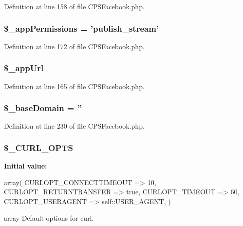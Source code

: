 Definition at line 158 of file CPSFacebook.php.

\hypertarget{classCPSFacebook_a6adcddc9592544d2e65aed888e2bfdfa}{
\subsubsection[{\$\_\-appPermissions}]{\setlength{\rightskip}{0pt plus 5cm}\$\_\-appPermissions = 'publish\_\-stream'}}
\label{classCPSFacebook_a6adcddc9592544d2e65aed888e2bfdfa}


Definition at line 172 of file CPSFacebook.php.

\hypertarget{classCPSFacebook_a4416500680a7b92e95184727c36eec91}{
\subsubsection[{\$\_\-appUrl}]{\setlength{\rightskip}{0pt plus 5cm}\$\_\-appUrl}}
\label{classCPSFacebook_a4416500680a7b92e95184727c36eec91}


Definition at line 165 of file CPSFacebook.php.

\hypertarget{classCPSFacebook_ac054a508d06da60c6ffc3aab3fd7b3e7}{
\subsubsection[{\$\_\-baseDomain}]{\setlength{\rightskip}{0pt plus 5cm}\$\_\-baseDomain = ''}}
\label{classCPSFacebook_ac054a508d06da60c6ffc3aab3fd7b3e7}


Definition at line 230 of file CPSFacebook.php.

\hypertarget{classCPSFacebook_a386bcc77c2c57c89359cc7632ac521ad}{
\subsubsection[{\$\_\-CURL\_\-OPTS}]{\setlength{\rightskip}{0pt plus 5cm}\$\_\-CURL\_\-OPTS}}
\label{classCPSFacebook_a386bcc77c2c57c89359cc7632ac521ad}
{\bfseries Initial value:}
\begin{DoxyCode}
 array(
        CURLOPT_CONNECTTIMEOUT => 10,
        CURLOPT_RETURNTRANSFER => true,
        CURLOPT_TIMEOUT => 60,
        CURLOPT_USERAGENT => self::USER_AGENT,
    )
\end{DoxyCode}
array Default options for curl. 

